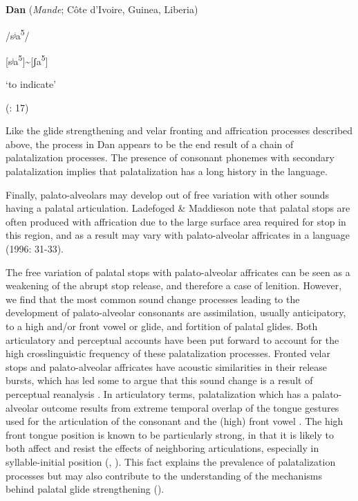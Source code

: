 \ea\label{ex:(4.38)}
   \textbf{Dan} (\textit{Mande}; Côte d’Ivoire, Guinea, Liberia)



/sʲa\textsuperscript{5}/



[sʲa\textsuperscript{5}]{\textasciitilde}[ʃa\textsuperscript{5}]



‘to indicate’



(\citealt{BearthZemp1967}: 17)

\z


Like the glide strengthening and velar fronting and affrication processes described above, the process in Dan appears to be the end result of a chain of palatalization processes. The presence of consonant phonemes with secondary palatalization implies that palatalization has a long history in the language.



  Finally, palato-alveolars may develop out of free variation with other sounds having a palatal articulation. Ladefoged \& Maddieson note that palatal stops are often produced with affrication due to the large surface area required for stop in this region, and as a result may vary with palato-alveolar affricates in a language (1996: 31-33).



  The free variation of palatal stops with palato-alveolar affricates can be seen as a weakening of the abrupt stop release, and therefore a case of lenition. However, we find that the most common sound change processes leading to the development of palato-alveolar consonants are assimilation, usually anticipatory, to a high and/or front vowel or glide, and fortition of palatal glides. Both articulatory and perceptual accounts have been put forward to account for the high crosslinguistic frequency of these palatalization processes. Fronted velar stops and palato-alveolar affricates have acoustic similarities in their release bursts, which has led some to argue that this sound change is a result of perceptual reanalysis \citep{Guion1998}. In articulatory terms, palatalization which has a palato-alveolar outcome results from extreme temporal overlap of the tongue gestures used for the articulation of the consonant and the (high) front vowel \citep{Bateman2007}. The high front tongue position is known to be particularly strong, in that it is likely to both affect and resist the effects of neighboring articulations, especially in syllable-initial position (\citealt{RecasensEspinosa2009}, \citealt{Recasens2014}). This fact explains the prevalence of palatalization processes but may also contribute to the understanding of the mechanisms behind palatal glide strengthening (\citealt{BybeeEasterday2019}).


